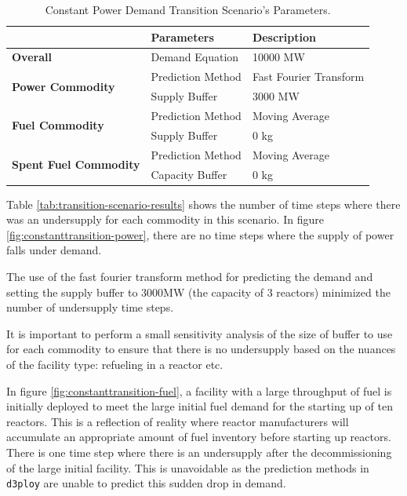 \documentclass[11pt,letterpaper]{article}
\newcommand{\deploy}{\texttt{d3ploy}\xspace}%
\begin{document}
\begin{table}[!htbp]
	\centering
	\caption {Constant Power Demand Transition Scenario's Parameters.}
	\label{tab:transition-scenario-constant-power}
	\begin{tabular}{|l|l|p{}|}
		\hline
		& \textbf{Parameters}    & \textbf{Description} \\ \hline
		\textbf{Overall}& Demand Equation & 10000 MW \\ \hline
		\multirow{2}{*}{\textbf{Power Commodity}} & Prediction Method      &  Fast Fourier Transform\\ \cline{2-3} 
		& Supply Buffer          &  3000 MW \\ \hline
		\multirow{2}{*}{\textbf{Fuel Commodity}}  & Prediction Method      &  Moving Average\\ \cline{2-3}
		& Supply Buffer & 0 kg \\ \hline
		\multirow{2}{*}{\textbf{Spent Fuel Commodity}}  & Prediction Method      &  Moving Average\\ \cline{2-3}
		& Capacity Buffer & 0 kg \\ \hline
	\end{tabular}
\end{table}

Table \ref{tab:transition-scenario-results} shows the number of time 
steps where there was an undersupply for each commodity in this scenario. 
In figure \ref{fig:constanttransition-power}, there are no time steps
where the supply of power falls under demand.

The use of the fast fourier transform method for predicting the
demand and setting the supply buffer to 3000MW (the capacity of 3 reactors)
minimized the number of undersupply time steps.

It is important to perform a small sensitivity analysis of the size 
of buffer to use for each commodity to ensure that there is no 
undersupply based on the nuances of the facility type: 
refueling in a reactor etc. 

In figure \ref{fig:constanttransition-fuel},
a facility with a large throughput of fuel is initially
deployed to meet the large initial fuel demand for the starting
up of ten reactors. 
This is a reflection of reality where reactor manufacturers will 
accumulate an appropriate amount of fuel inventory before starting 
up reactors. 
There is one time step where there is an undersupply after the 
decommissioning of the large initial facility.  
This is unavoidable as the prediction methods in \deploy are unable 
to predict this sudden drop in demand. 
\end{document}
